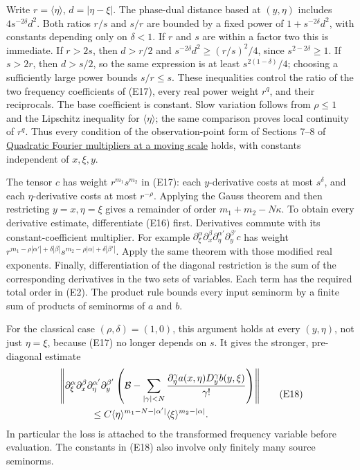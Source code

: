 \documentclass[
  11pt,
]{article}
\begin{document}
Write \(r=\langle\eta\rangle\), \(d=|\eta-\xi|\). The phase-dual
distance based at \((y,\eta)\) includes \(4s^{-2\delta}d^2\). Both
ratios \(r/s\) and \(s/r\) are bounded by a fixed power of
\(1+s^{-2\delta}d^2\), with constants depending only on \(\delta<1\). If
\(r\) and \(s\) are within a factor two this is immediate. If \(r>2s\),
then \(d>r/2\) and \(s^{-2\delta}d^2\geq (r/s)^2/4\), since
\(s^{2-2\delta}\geq1\). If \(s>2r\), then \(d>s/2\), so the same
expression is at least \(s^{2(1-\delta)}/4\); choosing a sufficiently
large power bounds \(s/r\leq s\). These inequalities control the ratio
of the two frequency coefficients of (E17), every real power weight
\(r^q\), and their reciprocals. The base coefficient is constant. Slow
variation follows from \(\rho\leq1\) and the Lipschitz inequality for
\(\langle\eta\rangle\); the same comparison proves local continuity of
\(r^q\). Thus every condition of the observation-point form of Sections
7--8 of \href{gauss-transform-estimates.pdf}{Quadratic Fourier
multipliers at a moving scale} holds, with constants independent of
\(x,\xi,y\).

The tensor \(c\) has weight \(r^{m_1}s^{m_2}\) in (E17): each
\(y\)-derivative costs at most \(s^\delta\), and each
\(\eta\)-derivative costs at most \(r^{-\rho}\). Applying the Gauss
theorem and then restricting \(y=x,\eta=\xi\) gives a remainder of order
\(m_1+m_2-N\kappa\). To obtain every derivative estimate, differentiate
(E16) first. Derivatives commute with its constant-coefficient
multiplier. For example \(\partial_\xi^\alpha\partial_x^\beta
\partial_\eta^{\alpha'}\partial_y^{\beta'}c\) has weight
\(r^{m_1-\rho|\alpha'|+\delta|\beta|}
s^{m_2-\rho|\alpha|+\delta|\beta'|}\). Apply the same theorem with those
modified real exponents. Finally, differentiation of the diagonal
restriction is the sum of the corresponding derivatives in the two sets
of variables. Each term has the required total order in (E2). The
product rule bounds every input seminorm by a finite sum of products of
seminorms of \(a\) and \(b\).

For the classical case \((\rho,\delta)=(1,0)\), this argument holds at
every \((y,\eta)\), not just \(\eta=\xi\), because (E17) no longer
depends on \(s\). It gives the stronger, pre-diagonal estimate \[
\begin{split}
&\left\|\partial_\xi^\alpha\partial_x^\beta
\partial_\eta^{\alpha'}\partial_y^{\beta'}
\left(\mathcal B-
\sum_{|\gamma|<N}\frac{\partial_\eta^\gamma a(x,\eta)
D_y^\gamma b(y,\xi)}{\gamma!}\right)\right\|\\
&\hspace{12mm}\leq C
\langle\eta\rangle^{m_1-N-|\alpha'|}
\langle\xi\rangle^{m_2-|\alpha|}.
\end{split}
\tag{E18}
\] In particular the loss is attached to the transformed frequency
variable before evaluation. The constants in (E18) also involve only
finitely many source seminorms.
\end{document}
